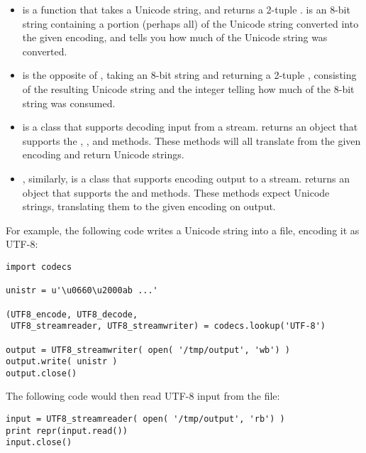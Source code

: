 \documentclass{howto}
\begin{document}
\begin{itemize}
\item {} is a function that takes a Unicode string, and
returns a 2-tuple .  
is an 8-bit string containing a portion (perhaps all) of the Unicode
string converted into the given encoding, and  tells you
how much of the Unicode string was converted.

\item {} is the opposite of , taking
an 8-bit string and returning a 2-tuple , consisting of the resulting Unicode string
 and the integer  telling how much of the
8-bit string was consumed.

\item {} is a class that supports decoding input from
a stream.   returns an object that
supports the , , and
 methods.  These methods will all translate from
the given encoding and return Unicode strings.

\item {}, similarly, is a class that supports
encoding output to a stream.  
returns an object that supports the  and
 methods.  These methods expect Unicode strings,
translating them to the given encoding on output.
\end{itemize}

For example, the following code writes a Unicode string into a file, 
encoding it as UTF-8:

\begin{verbatim}
import codecs

unistr = u'\u0660\u2000ab ...'

(UTF8_encode, UTF8_decode,
 UTF8_streamreader, UTF8_streamwriter) = codecs.lookup('UTF-8')

output = UTF8_streamwriter( open( '/tmp/output', 'wb') )
output.write( unistr )
output.close()
\end{verbatim}

The following code would then read UTF-8 input from the file:

\begin{verbatim}
input = UTF8_streamreader( open( '/tmp/output', 'rb') )
print repr(input.read())
input.close()
\end{verbatim}
\end{document}
